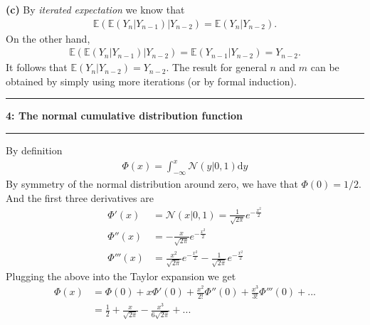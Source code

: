 \documentclass[11pt]{article}
\newcommand\question[2]{\vspace{.25in}\hrule\textbf{#1: #2}\vspace{.5em}\hrule\vspace{.10in}}
\renewcommand\part[1]{\vspace{.10in}\textbf{(#1)}}
\newcommand{\E}{\mathbb{E}}
\newcommand{\dy}{\mathrm{d}y}
\begin{document}
\part{c} By \textit{iterated expectation} we know that
\begin{align}
    \E(\E(Y_n\vert Y_{n - 1})\vert Y_{n - 2}) = \E(Y_n \vert Y_{n-2}).
\end{align}
On the other hand,
\begin{align}
    \E(\E(Y_n\vert Y_{n - 1})\vert Y_{n - 2}) = \E(Y_{n-1}\vert Y_{n - 2}) = Y_{n-2}.
\end{align}
It follows that $\E(Y_n\vert Y_{n-2}) = Y_{n-2}$. The result for general $n$ and $m$ can be obtained by simply using more iterations (or by formal induction).

\question{4}{The normal cumulative distribution function}
By definition
\begin{align}
    \Phi(x) = \int_{-\infty}^{x}\mathcal{N}(y\vert 0, 1) \dy
\end{align}
By symmetry of the normal distribution around zero, we have that $\Phi(0) = 1/2$. And the first three derivatives are
\begin{align}
    \Phi'(x) &= \mathcal{N}(x\vert 0, 1) = \frac{1}{\sqrt{2\pi}}e^{-\frac{x^2}{2}}\\
    \Phi''(x) & = -\frac{x}{\sqrt{2\pi}}e^{-\frac{x^2}{2}}\\
    \Phi'''(x) & = \frac{x^2}{\sqrt{2\pi}}e^{-\frac{x^2}{2}} - \frac{1}{\sqrt{2\pi}}e^{-\frac{x^2}{2}}
\end{align}
Plugging the above into the Taylor expansion we get
\begin{align}
    \Phi(x) &= \Phi(0) + x \Phi'(0) + \frac{x^2}{2!}\Phi''(0) + \frac{x^3}{3!}\Phi'''(0) + ... \nonumber\\
            &= \frac12 + \frac{x}{\sqrt{2\pi}} - \frac{x^3}{6\sqrt{2\pi}} + ... 
\end{align}
\end{document}
